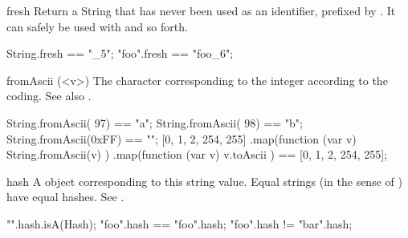 \begin{urbiscriptapi}
\item[fresh] Return a String that has never been used as an identifier,
  prefixed by \this.  It can safely be used with
   and so forth.
\begin{urbiassert}
String.fresh == "_5";
"foo".fresh == "foo_6";
\end{urbiassert}


\item[fromAscii](<v>) The character corresponding to the integer 
  according to the  coding.  See also .
\begin{urbiassert}
String.fromAscii(  97) == "a";
String.fromAscii(  98) == "b";
String.fromAscii(0xFF) == "\xff";
[0, 1, 2, 254, 255]
  .map(function (var v) { String.fromAscii(v) })
  .map(function (var v) { v.toAscii })
  == [0, 1, 2, 254, 255];
\end{urbiassert}


\item[hash]%
  A  object corresponding to this string value.  Equal
  strings (in the sense of ) have equal hashes.  See
  .

\begin{urbiassert}
"".hash.isA(Hash);
"foo".hash == "foo".hash;
"foo".hash != "bar".hash;
\end{urbiassert}



\end{urbiscriptapi}
